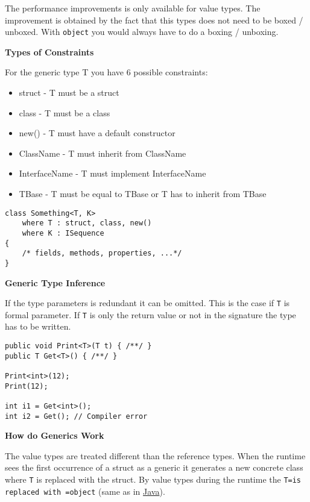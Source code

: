 \documentclass[11pt,twoside,landscape]{article}
\begin{document}
\begin{multicols}{3}
The performance improvements is only available for value types.
The improvement is obtained by the fact that this types does not need to be boxed / unboxed.
With \texttt{object} you would always have to do a boxing / unboxing.

\textbf{Types of Constraints}

For the generic type T you have 6 possible constraints:
\begin{itemize}
\item struct - T must be a struct
\item class - T must be a class
\item new() - T must have a default constructor
\item ClassName - T must inherit from ClassName
\item InterfaceName - T must implement InterfaceName
\item TBase - T must be equal to TBase or T has to inherit from TBase
\end{itemize}


\lstset{language=csharp,label= ,caption= ,captionpos=b,numbers=none}
\begin{lstlisting}
class Something<T, K>
    where T : struct, class, new()
    where K : ISequence
{
    /* fields, methods, properties, ...*/
}
\end{lstlisting}

\textbf{Generic Type Inference}

If the type parameters is redundant it can be omitted.
This is the case if \texttt{T} is formal parameter.
If \texttt{T} is only the return value or not in the signature the type has to be written.
\lstset{language=csharp,label= ,caption= ,captionpos=b,numbers=none}
\begin{lstlisting}
public void Print<T>(T t) { /**/ }
public T Get<T>() { /**/ }

Print<int>(12);
Print(12);

int i1 = Get<int>();
int i2 = Get(); // Compiler error
\end{lstlisting}

\textbf{How do Generics Work}

The value types are treated different than the reference types.
When the runtime sees the first occurrence of a struct as a generic it generates a new concrete class where \texttt{T} is replaced with the struct.
By value types during the runtime the \texttt{T=is replaced with =object} (same as in \href{../../../roam/20201116150053-java.org}{Java}).



\end{multicols}
\end{document}
